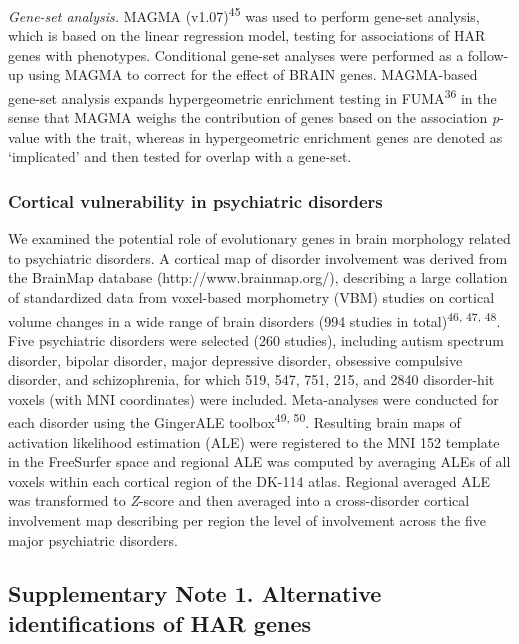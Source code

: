 \begin{refsection}
\noindent
\textit{Gene-set analysis. }MAGMA (v1.07)\textsuperscript{45} was used to perform gene-set analysis, which is based on the linear regression model, testing for associations of HAR genes with phenotypes. Conditional gene-set analyses were performed as a follow-up using MAGMA to correct for the effect of BRAIN genes. MAGMA-based gene-set analysis expands hypergeometric enrichment testing in FUMA\textsuperscript{36} in the sense that MAGMA weighs the contribution of genes based on the association \textit{p}-value with the trait, whereas in hypergeometric enrichment genes are denoted as ‘implicated’ and then tested for overlap with a gene-set. 

\subsubsection*{Cortical vulnerability in psychiatric disorders}
We examined the potential role of evolutionary genes in brain morphology related to psychiatric disorders. A cortical map of disorder involvement was derived from the BrainMap database (http://www.brainmap.org/), describing a large collation of standardized data from voxel-based morphometry (VBM) studies on cortical volume changes in a wide range of brain disorders (994 studies in total)\textsuperscript{46, 47, 48}. Five psychiatric disorders were selected (260 studies), including autism spectrum disorder, bipolar disorder, major depressive disorder, obsessive compulsive disorder, and schizophrenia, for which 519, 547, 751, 215, and 2840 disorder-hit voxels (with MNI coordinates) were included. Meta-analyses were conducted for each disorder using the GingerALE toolbox\textsuperscript{49, 50}. Resulting brain maps of activation likelihood estimation (ALE) were registered to the MNI 152 template in the FreeSurfer space and regional ALE was computed by averaging ALEs of all voxels within each cortical region of the DK-114 atlas. Regional averaged ALE was transformed to \textit{Z}-score and then averaged into a cross-disorder cortical involvement map describing per region the level of involvement across the five major psychiatric disorders.

\subsection*{Supplementary Note 1. Alternative identifications of HAR genes}

\end{refsection}
